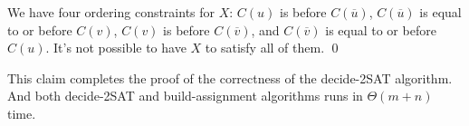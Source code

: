 We have four ordering constraints for $X$: 
$C(u)$ is before $C(\overline{u})$,
$C(\overline{u})$ is equal to or before $C(v)$,
$C(v)$ is before $C(\overline{v})$,
and $C(\overline{v})$ is equal to or before $C(u)$.
It's not possible to have $X$ to satisfy all of them. \qed

This claim completes the proof of the correctness of the decide-2SAT algorithm.
And both decide-2SAT and build-assignment algorithms runs in $\Theta(m + n)$ time.


